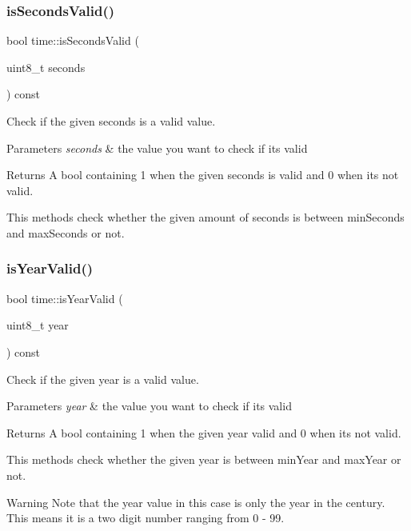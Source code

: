 \subsubsection{\texorpdfstring{is\+Seconds\+Valid()}{isSecondsValid()}}
{\footnotesize\ttfamily bool time\+::is\+Seconds\+Valid (\begin{DoxyParamCaption}\item[{uint8\+\_\+t}]{seconds }\end{DoxyParamCaption}) const}



Check if the given seconds is a valid value. 


\begin{DoxyParams}{Parameters}
{\em seconds} & the value you want to check if it\textquotesingle{}s valid \\
\hline
\end{DoxyParams}
\begin{DoxyReturn}{Returns}
A bool containing 1 when the given seconds is valid and 0 when it\textquotesingle{}s not valid.
\end{DoxyReturn}
This methods check whether the given amount of seconds is between min\+Seconds and max\+Seconds or not. \mbox{\label{classtime_ad6269d0f650cfc32e0ac83b09816abad}} 
\subsubsection{\texorpdfstring{is\+Year\+Valid()}{isYearValid()}}
{\footnotesize\ttfamily bool time\+::is\+Year\+Valid (\begin{DoxyParamCaption}\item[{uint8\+\_\+t}]{year }\end{DoxyParamCaption}) const}



Check if the given year is a valid value. 


\begin{DoxyParams}{Parameters}
{\em year} & the value you want to check if it\textquotesingle{}s valid \\
\hline
\end{DoxyParams}
\begin{DoxyReturn}{Returns}
A bool containing 1 when the given year valid and 0 when it\textquotesingle{}s not valid.
\end{DoxyReturn}
This methods check whether the given year is between min\+Year and max\+Year or not. \begin{DoxyWarning}{Warning}
Note that the year value in this case is only the year in the century. This means it is a two digit number ranging from 0 -\/ 99. 
\end{DoxyWarning}


